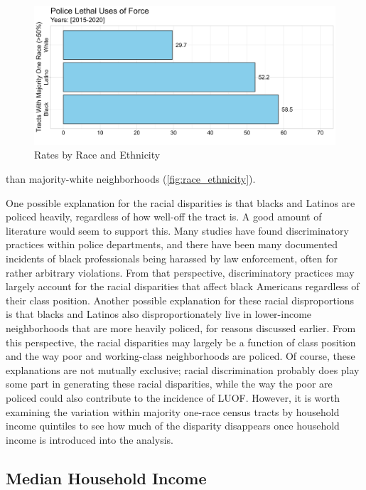 \documentclass[12pt]{article}
\begin{document}
\begin{figure}[H]
  \centering %
  \includegraphics[width=\linewidth]{images/majority_race_only_ind}
  \captionsetup{justification=centering, margin=2cm}
  \caption[Rates by Race and Ethnicity]{Rates by Race and Ethnicity}
  \label{fig:race_ethnicity}
\end{figure}

\noindent{}than majority-white neighborhoods (\autoref{fig:race_ethnicity}).

One possible explanation for the racial disparities is that blacks and Latinos are policed heavily, regardless of how well-off the tract is. A good amount of literature would seem to support this. Many studies have found discriminatory practices within police departments, and there have been many documented incidents of black professionals being harassed by law enforcement, often for rather arbitrary violations. From that perspective, discriminatory practices may largely account for the racial disparities that affect black Americans regardless of their class position. Another possible explanation for these racial disproportions is that blacks and Latinos also disproportionately live in lower-income neighborhoods that are more heavily policed, for reasons discussed earlier. From this perspective, the racial disparities may largely be a function of class position and the way poor and working-class neighborhoods are policed. Of course, these explanations are not mutually exclusive; racial discrimination probably does play some part in generating these racial disparities, while the way the poor are policed could also contribute to the incidence of LUOF. However, it is worth examining the variation within majority one-race census tracts by household income quintiles to see how much of the disparity disappears once household income is introduced into the analysis.

\subsection{Median Household Income}
\end{document}
